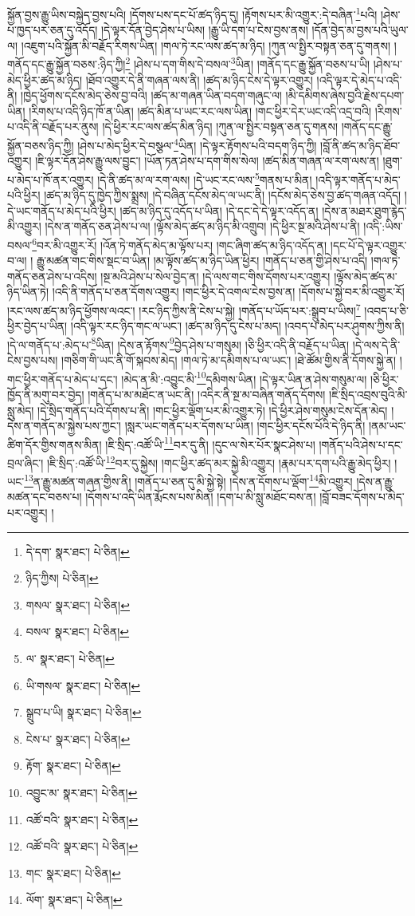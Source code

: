 སྐྱོན་བྱས་རྒྱུ་ཡིས་བསྐྱེད་བྱས་པའི། །དོགས་པས་དང་པོ་ཚད་ཉིད་དུ། །རྟོགས་པར་མི་འགྱུར་:དེ་བཞིན་\footnote{དེ་དག་  སྣར་ཐང་།  པེ་ཅིན། }པའི། །ཤེས་པ་ཁྱད་པར་ཅན་དུ་འདོད། །དེ་ལྟར་དོན་བྱེད་ཤེས་པ་ཡིས། །རྒྱུ་ཡི་དག་པ་ངེས་བྱས་ནས། །དོན་བྱེད་མ་བྱས་པའི་ཡུལ་ལ། །འཇུག་པའི་སྐྱོན་མི་བརྗོད་རིགས་ཡིན། །གལ་ཏེ་རང་ལས་ཚད་མ་ཉིད། །ཀུན་ལ་སྤྱིར་བསྟན་ཅན་དུ་གནས། །གནོད་དང་རྒྱུ་སྐྱོན་བཅས་:ཉིད་ཀྱི།\footnote{ཉིད་ཀྱིས།  པེ་ཅིན། } །ཤེས་པ་དག་གིས་དེ་བསལ་\footnote{གསལ་  སྣར་ཐང་།  པེ་ཅིན། }ཡིན། །གནོད་དང་རྒྱུ་སྐྱོན་བཅས་པ་ཡི། །ཤེས་པ་མེད་ཕྱིར་ཚད་མ་ཉིད། །ཐོབ་འགྱུར་དེ་ནི་གཞན་ལས་ནི། །ཚད་མ་ཉིད་ངེས་དེ་ལྟར་འགྱུར། །འདི་ལྟར་དེ་མེད་པ་འདི་ནི། །ཁྱེད་ཕྱོགས་དངོས་མེད་ཅེས་བྱ་བའི། །ཚད་མ་གཞན་ཡིན་བདག་གཞུང་ལ། །མི་དམིགས་ཞེས་བྱའི་རྗེས་དཔག་ཡིན། །རིགས་པ་འདི་ཉིད་ཁོ་ན་ཡིན། །ཚད་མིན་པ་ཡང་རང་ལས་ཡིན། །གང་ཕྱིར་དེར་ཡང་འདི་འདྲ་བའི། །རིགས་པ་འདི་ནི་བརྗོད་པར་ནུས། །དེ་ཕྱིར་རང་ལས་ཚད་མིན་ཉིད། །ཀུན་ལ་སྤྱིར་བསྟན་ཅན་དུ་གནས། །གནོད་དང་རྒྱུ་སྐྱོན་བཅས་ཉིད་ཀྱི། །ཤེས་པ་མེད་ཕྱིར་དེ་བསྩལ་\footnote{བསལ་  སྣར་ཐང་།  པེ་ཅིན། }ཡིན། །དེ་ལྟར་རྟོགས་པའི་བདག་ཉིད་ཀྱི། །བློ་ནི་ཚད་མ་ཉིད་ཐོབ་འགྱུར། །ཇི་ལྟར་དོན་ཤེས་རྒྱུ་ལས་བྱུང་། །ཡོན་ཏན་ཤེས་པ་དག་གིས་སེལ། །ཚད་མིན་གཞན་ལ་རག་ལས་ན། །ཐུག་པ་མེད་པ་ཁོ་ནར་འགྱུར། །དེ་ནི་ཚད་མ་ལ་རག་ལས། །དེ་ཡང་རང་ལས་\footnote{ལ་  སྣར་ཐང་།  པེ་ཅིན། }གནས་པ་མིན། །འདི་ལྟར་གནོད་པ་མེད་པའི་ཕྱིར། །ཚད་མ་ཉིད་དུ་ཁྱེད་ཀྱིས་སྨྲས། །དེ་བཞིན་དངོས་མེད་ལ་ཡང་ནི། །དངོས་མེད་ཅེས་བྱ་ཚད་གཞན་འདོད། །དེ་ཡང་གནོད་པ་མེད་པའི་ཕྱིར། །ཚད་མ་ཉིད་དུ་འདོད་པ་ཡིན། །དེ་དང་དེ་དེ་ལྟར་འདོད་ན། །དེས་ན་མཐར་ཐུག་རྙེད་མི་འགྱུར། །དེས་ན་གནོད་ཅན་ཤེས་པ་ལ། །ལྟོས་མེད་ཚད་མ་ཉིད་མི་འགྲུབ། །དེ་ཕྱིར་སྔ་མའི་ཤེས་པ་ནི། །འདི་:ཡིས་བསལ་\footnote{ཡི་གསལ་  སྣར་ཐང་།  པེ་ཅིན། }བར་མི་འགྱུར་རོ། །འོན་ཏེ་གནོད་མེད་མ་ལྟོས་པར། །གང་ཞིག་ཚད་མ་ཉིད་འདོད་ན། །དང་པོ་དེ་ལྟར་འགྱུར་བ་ལ། །
རྒྱུ་མཚན་གང་གིས་སྡང་བ་ཡིན། །མ་ལྟོས་ཚད་མ་ཉིད་ཡིན་ཕྱིར། །གནོད་པ་ཅན་གྱི་ཤེས་པ་འདི། །གལ་ཏེ་གནོད་ཅན་ཤེས་པ་འདིས། །སྔ་མའི་ཤེས་པ་སེལ་བྱེད་ན། །དེ་ལས་གང་གིས་དོགས་པར་འགྱུར། །ལྟོས་མེད་ཚད་མ་ཉིད་ཡིན་ཏེ། །འདི་ནི་གནོད་པ་ཅན་དོགས་འགྱུར། །གང་ཕྱིར་དེ་འགལ་ངེས་བྱས་ན། །དོགས་པ་སྐྱེ་བར་མི་འགྱུར་རོ། །རང་ལས་ཚད་མ་ཉིད་ཕྱོགས་ལའང་། །རང་ཉིད་ཀྱིས་ནི་ངེས་པ་སྐྱེ། །གནོད་པ་ཡོད་པར་:སྒྲུབ་པ་ཡིས།\footnote{སྒྲུབ་པ་ཡི།  སྣར་ཐང་།  པེ་ཅིན། } །འབད་པ་ཅི་ཕྱིར་བྱེད་པ་ཡིན། །འདི་ལྟར་རང་ཉིད་གང་ལ་ཡང་། །ཚད་མ་ཉིད་དུ་ངེས་པ་མད། །འབད་པ་མེད་པར་ཤུགས་ཀྱིས་ནི། །དེ་ལ་གནོད་པ་:མེད་པ་\footnote{ངེས་པ་  སྣར་ཐང་།  པེ་ཅིན། }ཡིན། །དེས་ན་རྟོགས་\footnote{རྟོག་  སྣར་ཐང་།  པེ་ཅིན། }བྱེད་ཤེས་པ་གསུམ། །ཅི་ཕྱིར་འདི་ནི་བརྗོད་པ་ཡིན། །དེ་ལས་དེ་ནི་ངེས་བྱས་པས། །གཅིག་གི་ཡང་ནི་གོ་སྐབས་མེད། །གལ་ཏེ་མ་དམིགས་པ་ལ་ཡང་། །ཐེ་ཚོམ་གྱིས་ནི་དོགས་སྐྱེ་ན། །གང་ཕྱིར་གནོད་པ་མེད་པ་དང་། །མེད་ན་མི་:འབྱུང་མི་\footnote{འབྱུང་མ་  སྣར་ཐང་།  པེ་ཅིན། }དམིགས་ཡིན། །དེ་ལྟར་ཡིན་ན་ཤེས་གསུམ་ལ། །ཅི་ཕྱིར་ཁྱོད་ནི་མགུ་བར་བྱེད། །གནོད་པ་མ་མཐོང་ན་ཡང་ནི། །འདིར་ནི་སྔ་མ་བཞིན་གནོད་དོགས། །ཇི་སྲིད་འབྲས་བུའི་མི་སླུ་མེད། །དེ་སྲིད་གནོད་པའི་དོགས་པ་ནི། །གང་ཕྱིར་ལྡོག་པར་མི་འགྱུར་ཏེ། །དེ་ཕྱིར་ཤེས་གསུམ་ངེས་དོན་མེད། །དེས་ན་གནོད་མ་སྐྱེས་པས་ཀྱང་། །སླར་ཡང་གནོད་པར་དོགས་པ་ཡིན། །གང་ཕྱིར་དངོས་པོའི་དེ་ཉིད་ནི། །ནམ་ཡང་ཚིག་དོར་གྱིས་གནས་མིན། །ཇི་སྲིད་:འཚོ་ཡི་\footnote{འཚོ་བའི་  སྣར་ཐང་།  པེ་ཅིན། }བར་དུ་ནི། །དུང་ལ་སེར་པོར་སྣང་ཤེས་པ། །གནོད་པའི་ཤེས་པ་དང་བྲལ་ཞིང་། །ཇི་སྲིད་:འཚོ་ཡི་\footnote{འཚོ་བའི་  སྣར་ཐང་།  པེ་ཅིན། }བར་དུ་སྐྱེས། །གང་ཕྱིར་ཚད་མར་སྐྱེ་མི་འགྱུར། །རྣམ་པར་དག་པའི་རྒྱུ་མེད་ཕྱིར། །ཡང་\footnote{གང་  སྣར་ཐང་།  པེ་ཅིན། }ན་རྒྱུ་མཚན་གཞན་གྱིས་ནི། །གནོད་པ་ཅན་དུ་མི་སྐྱེ་སྟེ། །དེས་ན་དོགས་པ་ལྡོག་\footnote{ལོག་  སྣར་ཐང་།  པེ་ཅིན། }མི་འགྱུར། །དེས་ན་རྒྱུ་མཚན་དང་བཅས་པ། །དོགས་པ་འདི་ཡིན་རྨོངས་པས་མིན། །དག་པ་མི་སླུ་མཐོང་བས་ན། །བློ་བཟང་དོགས་པ་མེད་པར་འགྱུར། །
